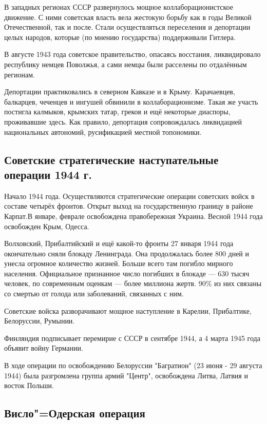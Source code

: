 В западных регионах СССР развернулось мощное коллаборационистское движение. С ними советская власть вела жестокую борьбу как в годы Великой Отечественной, так и после. Стали осуществляться переселения и депортации целых народов, которые (по мнению государства) поддерживали  Гитлера.

В августе 1943 года советское правительство, опасаясь восстания, ликвидировало республику немцев Поволжья, а сами немцы были расселены по отдалённым регионам.

Депортации практиковались в северном Кавказе и в Крыму. Карачаевцев, балкарцев, чеченцев и ингушей обвинили в коллаборационизме. Такая же участь постигла калмыков, крымских татар, греков и ещё некоторые диаспоры, проживавшие здесь. Как правило, депортация сопровождалась ликвидацией национальных автономий, русификацией местной топономики.

\subsection{Советские стратегические наступательные операции 1944 г.}

Начало 1944 года. Осуществляются стратегические операции советских войск в составе четырёх фронтов. Открыт выход на государственную границу в районе Карпат.В январе, феврале освобождена правобережная Украина. Весной 1944 года освобожден Крым, Одесса.

Волховский, Прибалтийский и ещё какой-то фронты 27 января 1944 года окончательно сняли блокаду Ленинграда. Она продолжалась более 800 дней и унесла огромное количество жизней. Больше всего там погибло мирного населения. Официальное признанное число погибших в блокаде --- 630 тысяч человек, по современным оценкам --- более миллиона жертв. 90\% из них связаны со смертью от голода или заболеваний, связанных с ним.

Советские войска разворачивают мощное наступление в Карелии, Прибалтике, Белоруссии, Румынии.

Финляндия подписывает перемирие с СССР в сентябре 1944, а 4 марта 1945 года объявит войну Германии.

В ходе операции по освобождению Белоруссии "Багратион" (23 июня - 29 августа 1944) была разгромлена группа армий "Центр", освобождена Литва, Латвия и восток Польши.

\subsection{Висло"=Одерская операция}

